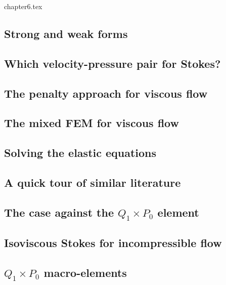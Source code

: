 \begin{flushright} {\tiny {\color{gray} chapter6.tex}} \end{flushright}

\subsection{Strong and weak forms}  %
\subsection{Which velocity-pressure pair for Stokes?}\label{ss:pair} %

\newpage
\subsection{The penalty approach for viscous flow}\label{sec:penalty} %
\subsection{The mixed FEM for viscous flow} \label{sec:mixed}  %
\subsection{Solving the elastic equations}  %
\subsection{A quick tour of similar literature}  %
\subsection{The case against the $Q_1\times P_0$ element}  %
\subsection{Isoviscous Stokes for incompressible flow}\label{ss:isovisc} 
\subsection{$Q_1\times P_0$ macro-elements} \label{ss:meshtopos}  %
